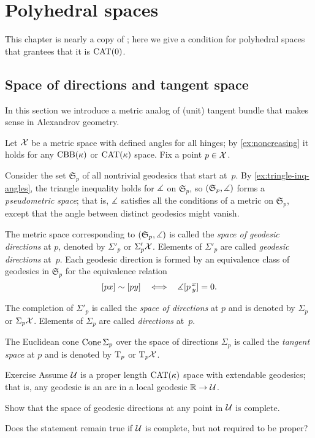 \chapter{Polyhedral spaces}\label{chapter:polyhedral}

This chapter is nearly a copy of \cite[Sections 3.4--3.6]{alexander-kapovitch-petrunin-2019};
here we give a condition for polyhedral spaces that grantees that it is $\mathrm{CAT}(0)$.


\section{Space of directions and tangent space}
\label{sec:tangent-space+directions}

In this section we introduce a metric analog of (unit) tangent bundle that makes sense in Alexandrov geometry.

Let $\mathcal{X}$ be a metric space with defined angles for all hinges;
by \ref{ex:noncreasing} it holds for any $\mathrm{CBB}(\kappa)$ or $\mathrm{CAT}(\kappa)$ space.
Fix a point $p\in \mathcal{X}$. 

Consider the set $\mathfrak{S}_p$ 
of all nontrivial geodesics  that start at~$p$.
By \ref{ex:tringle-inq-angles}, the triangle inequality holds for $\measuredangle$ on $\mathfrak{S}_p$,
so
 $(\mathfrak{S}_p,\measuredangle)$ 
forms a \emph{pseudometric space};
that is, $\measuredangle$ satisfies all the conditions of a metric on $\mathfrak{S}_p$, except that  the angle between distinct geodesics might vanish.

The metric space corresponding to  $(\mathfrak{S}_p,\measuredangle)$ is called the \emph{space of geodesic directions} at $p$, denoted by $\Sigma'_p$ or $\Sigma'_p\mathcal{X}$.
Elements of $\Sigma'_p$ are called \emph{geodesic directions} at~$p$.
Each geodesic direction is formed by an equivalence class of geodesics in $\mathfrak{S}_p$
for the equivalence relation 
\[[px]\sim[py]\ \ \iff\ \ \mangle\hinge pxy=0.\]

The completion of $\Sigma'_p$ is called the 
\emph{space of directions} at $p$ and is denoted by $\Sigma_p$ or $\Sigma_p\mathcal{X}$.
Elements of $\Sigma_p$ are called \emph{directions} at~$p$.

The Euclidean cone $\mathop{\rm Cone}\nolimits\Sigma_p$ over the space of directions $\Sigma_p$ is called the \emph{tangent space} at  $p$ and is denoted by $\mathrm{T}_p$ or $\mathrm{T}_p\mathcal{X}$.

\begin{thm}{Exercise}\label{ex:geod-CBA}
Assume $\mathcal{U}$ is a proper length $\mathrm{CAT}(\kappa)$ space
 with extendable geodesics;
that is, any geodesic is an arc in a local geodesic $\mathbb{R}\to \mathcal{U}$.

Show that the space of geodesic directions at any point in $\mathcal{U}$ is complete.

Does the statement remain true if $\mathcal{U}$ is complete, but not required to be proper?
\end{thm}


